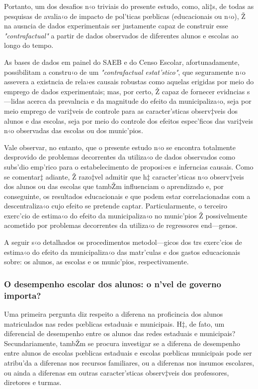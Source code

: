 \documentclass[a4paper, 12pt]{article}
\begin{document}
Portanto, um dos desafios n‹o triviais do presente estudo, como, ali‡s, de todas as pesquisas de avalia‹o de impacto de pol’ticas pœblicas (educacionais ou n‹o), Ž na ausncia de dados experimentais ser justamente capaz de construir esse \emph{"contrafactual"} a partir de dados observados de diferentes alunos e escolas ao longo do tempo. 

As bases de dados em painel do SAEB e do Censo Escolar, afortunadamente,  possibilitam a constru‹o de um  \emph{"contrafactual estat’stico"}, que seguramente n‹o assevera a existncia de rela›es causais robustas como aquelas erigidas por meio do emprego de dados experimentais; mas, por certo, Ž capaz de fornecer evidncias s—lidas acerca da prevalncia e da magnitude do efeito da municipaliza‹o, seja por meio emprego de vari‡veis de controle para as caracter’sticas observ‡veis dos alunos e das escolas, seja por meio do controle dos efeitos espec’ficos das vari‡veis n‹o observadas das escolas ou dos munic’pios.

Vale observar, no entanto, que o presente estudo n‹o se encontra totalmente desprovido de problemas decorrentes da utiliza‹o de dados observados como subs’dio emp’rico para o estabelecimento de proposi›es e inferncias causais. Como se comentar‡ adiante, Ž razo‡vel admitir que h‡ caracter’sticas n‹o observ‡veis dos alunos ou das escolas que tambŽm influenciam o aprendizado e, por conseguinte, os resultados educacionais e que podem estar correlacionadas com a descentraliza‹o cujo efeito se pretende captar. Particularmente, o terceiro exerc’cio de estima‹o do efeito da municipaliza‹o no munic’pios Ž possivelmente acometido por problemas decorrentes da utiliza‹o de regressores end—genos. 

A seguir s‹o detalhados os procedimentos metodol—gicos dos trs exerc’cios de estima‹o do efeito da municipaliza‹o das matr’culas e dos gastos educacionais sobre: os alunos, as escolas e os munic’pios, respectivamente.

\subsubsection{O desempenho escolar dos alunos: o n’vel de governo importa?}

Uma primeira pergunta diz respeito a diferena na proficincia dos alunos matriculados nas redes pœblicas estaduais e municipais. H‡, de fato, um diferencial de desempenho entre os alunos das redes estaduais e municipais? Secundariamente, tambŽm se procura investigar se a diferena de desempenho entre alunos de escolas pœblicas estaduais e escolas pœblicas municipais pode ser atribu’da a diferenas nos recursos familiares, ou a diferenas nos insumos escolares, ou ainda a diferenas em outras caracter’sticas observ‡veis dos professores, diretores e turmas.
\end{document}
